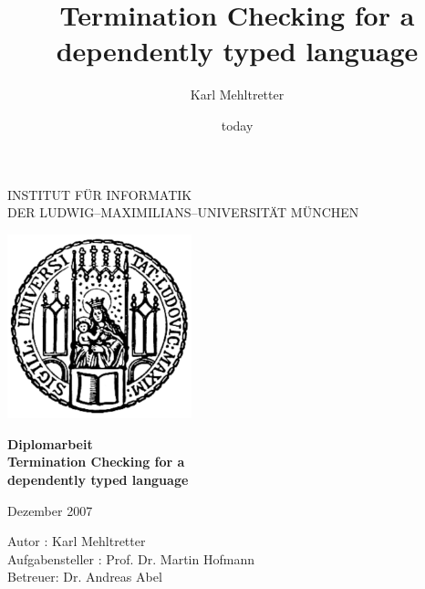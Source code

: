 \documentclass[a4paper,11pt]{report}
\begin{document}
\begin{titlepage}
\begin{center}


\vspace*{-2cm}

{\Huge INSTITUT F\"UR INFORMATIK\\[1mm]} %
DER LUDWIG--MAXIMILIANS--UNIVERSIT\"AT M\"UNCHEN\\

\vspace*{1cm}

\includegraphics[width=0.4\textwidth]{siegel.pdf}

\vspace*{2cm}

{\Large \textbf{Diplomarbeit}}\\

\vspace{2.0cm}
{\Huge \textbf{Termination Checking for a}}\\
\vspace*{3mm}
{\Huge \textbf{dependently typed language}}\\

\vspace{2cm}

\large{Dezember 2007}

\vspace{1.5cm}

  \begin{Large}
      Autor : Karl Mehltretter\\
      Aufgabensteller : Prof. Dr. Martin Hofmann\\
      Betreuer: Dr. Andreas Abel
  \end{Large}

\end{center}
\end{titlepage} 



\title{Termination Checking for a dependently typed language}
\author{Karl Mehltretter}
\date{today}
\end{document}
